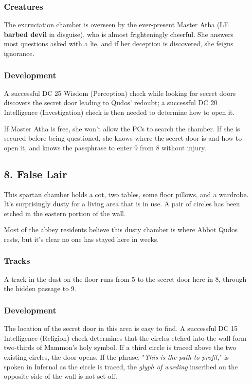 \documentclass[10pt,a4paper,twoside,bg=print,twocolumn,openany,nodeprecatedcode]{dndbook}
\begin{document}
\subsubsection{Creatures}
The excruciation chamber is overseen by the ever-present Master Atha (LE \textbf{barbed devil} in disguise), who is almost frighteningly cheerful. She answers most questions asked with a lie, and if her deception is discovered, she feigns ignorance.

\subsubsection{Development}
A successful DC 25 Wisdom (Perception) check while looking for secret doors discovers the secret door leading to Qudos' redoubt; a successful DC 20 Intelligence (Investigation) check is then needed to determine how to open it.

If Master Atha is free, she won't allow the PCs to search the chamber. If she is secured before being questioned, she knows where the secret door is and how to open it, and knows the passphrase to enter 9 from 8 without injury.

\subsection{8. False Lair}
\begin{DndReadAloud}{}
This spartan chamber holds a cot, two tables, some floor pillows, and a wardrobe. It's surprisingly dusty for a living area that is in use. A pair of circles has been etched in the eastern portion of the wall.

\end{DndReadAloud}

Most of the abbey residents believe this dusty chamber is where Abbot Qudos rests, but it's clear no one has stayed here in weeks.

\subsubsection{Tracks}
A track in the dust on the floor runs from 5 to the secret door here in 8, through the hidden passage to 9.

\subsubsection{Development}
The location of the secret door in this area is easy to find. A successful DC 15 Intelligence (Religion) check determines that the circles etched into the wall form two-thirds of Mammon's holy symbol. If a third circle is traced above the two existing circles, the door opens. If the phrase, "\textit{This is the path to profit}," is spoken in Infernal as the circle is traced, the \textit{glyph of warding} inscribed on the opposite side of the wall is not set off.
\end{document}
